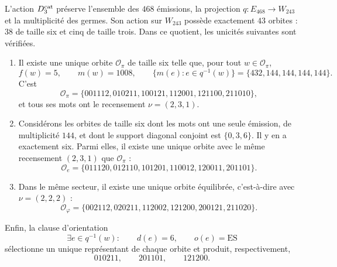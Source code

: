 \begin{theorem}
\label{thm:selector-orbital-constantes}
L'action \(D_3^{\rm cat}\) préserve l'ensemble des \(468\) émissions,
la projection \(q:E_{468}\to W_{243}\) et la multiplicité des germes. Son
action sur \(W_{243}\) possède exactement \(43\) orbites : \(38\) de taille
six et cinq de taille trois. Dans ce quotient, les unicités suivantes
sont vérifiées.

\begin{enumerate}
\item Il existe une unique orbite \(\mathcal O_\pi\) de taille six telle que, pour
tout \(w\in\mathcal O_\pi\),
\[
 f(w)=5,
 \qquad m(w)=1008,
 \qquad
 \{m(e):e\in q^{-1}(w)\}=\{432,144,144,144,144\}.
\]
C'est
\[
\mathcal O_\pi=
\{001112,010211,100121,112001,121100,211010\},
\]
et tous ses mots ont le recensement \(\nu=(2,3,1)\).

\item Considérons les orbites de taille six dont les mots ont une seule
émission, de multiplicité \(144\), et dont le support diagonal conjoint est
\(\{0,3,6\}\). Il y en a exactement six. Parmi elles, il existe une unique orbite
avec le même recensement \((2,3,1)\) que \(\mathcal O_\pi\) :
\[
\mathcal O_e=
\{011120,012110,101201,110012,120011,201101\}.
\]

\item Dans le même secteur, il existe une unique orbite équilibrée, c'est-à-dire avec
\(\nu=(2,2,2)\) :
\[
\mathcal O_\varphi=
\{002112,020211,112002,121200,200121,211020\}.
\]
\end{enumerate}

Enfin, la clause d'orientation
\begin{equation}
 \exists e\in q^{-1}(w):
 \qquad d(e)=6,
 \qquad o(e)=\mathrm{ES}
 \label{eq:gauge-orbital-constantes}
\end{equation}
sélectionne un unique représentant de chaque orbite et produit, respectivement,
\[
 \boxed{010211,\qquad201101,\qquad121200.}
\]
\end{theorem}

